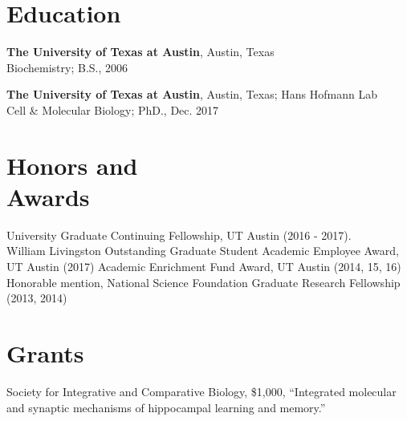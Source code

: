 \documentclass[margin,line]{resume}
\begin{document}
\pagestyle{plain}

\begin{resume}

    \section{\mysidestyle Education}

    {\bf The University of Texas at Austin}, Austin, Texas \\Biochemistry; B.S., 2006


    {\bf The University of Texas at Austin}, Austin, Texas; Hans Hofmann Lab
\\Cell \& Molecular Biology; PhD., Dec. 2017

    \section{\mysidestyle Honors and\\Awards} 
University Graduate Continuing Fellowship, UT Austin (2016 - 2017).\\
William Livingston Outstanding Graduate Student Academic Employee Award, UT Austin (2017)
Academic Enrichment Fund Award, UT Austin (2014, 15, 16)
Honorable mention, National Science Foundation Graduate Research Fellowship (2013, 2014)


\section{\mysidestyle Grants}

Society for Integrative and Comparative Biology, \$1,000, 
``Integrated molecular and synaptic mechanisms of hippocampal learning and memory.''



\end{resume}
\end{document}
